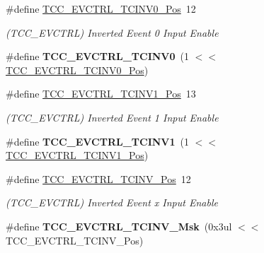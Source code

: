 \begin{DoxyCompactItemize}
\item 
\hypertarget{group___s_a_m_l21___t_c_c_ga7daf4150ce0d26a90f17b7d20997e5b0}{}\#define \hyperlink{group___s_a_m_l21___t_c_c_ga7daf4150ce0d26a90f17b7d20997e5b0}{T\+C\+C\+\_\+\+E\+V\+C\+T\+R\+L\+\_\+\+T\+C\+I\+N\+V0\+\_\+\+Pos}~12\label{group___s_a_m_l21___t_c_c_ga7daf4150ce0d26a90f17b7d20997e5b0}

\begin{DoxyCompactList}\small\item\em (T\+C\+C\+\_\+\+E\+V\+C\+T\+R\+L) Inverted Event 0 Input Enable \end{DoxyCompactList}\item 
\hypertarget{group___s_a_m_l21___t_c_c_ga72c03f6e26459fcca39c701dbfada328}{}\#define {\bfseries T\+C\+C\+\_\+\+E\+V\+C\+T\+R\+L\+\_\+\+T\+C\+I\+N\+V0}~(1 $<$$<$ \hyperlink{group___s_a_m_l21___t_c_c_ga7daf4150ce0d26a90f17b7d20997e5b0}{T\+C\+C\+\_\+\+E\+V\+C\+T\+R\+L\+\_\+\+T\+C\+I\+N\+V0\+\_\+\+Pos})\label{group___s_a_m_l21___t_c_c_ga72c03f6e26459fcca39c701dbfada328}

\item 
\hypertarget{group___s_a_m_l21___t_c_c_ga8eac0133c857f9d5e1b7f58578a62379}{}\#define \hyperlink{group___s_a_m_l21___t_c_c_ga8eac0133c857f9d5e1b7f58578a62379}{T\+C\+C\+\_\+\+E\+V\+C\+T\+R\+L\+\_\+\+T\+C\+I\+N\+V1\+\_\+\+Pos}~13\label{group___s_a_m_l21___t_c_c_ga8eac0133c857f9d5e1b7f58578a62379}

\begin{DoxyCompactList}\small\item\em (T\+C\+C\+\_\+\+E\+V\+C\+T\+R\+L) Inverted Event 1 Input Enable \end{DoxyCompactList}\item 
\hypertarget{group___s_a_m_l21___t_c_c_gace287edcae5cd696105c4405301d0cf9}{}\#define {\bfseries T\+C\+C\+\_\+\+E\+V\+C\+T\+R\+L\+\_\+\+T\+C\+I\+N\+V1}~(1 $<$$<$ \hyperlink{group___s_a_m_l21___t_c_c_ga8eac0133c857f9d5e1b7f58578a62379}{T\+C\+C\+\_\+\+E\+V\+C\+T\+R\+L\+\_\+\+T\+C\+I\+N\+V1\+\_\+\+Pos})\label{group___s_a_m_l21___t_c_c_gace287edcae5cd696105c4405301d0cf9}

\item 
\hypertarget{group___s_a_m_l21___t_c_c_ga517b9a375c6274ec2b3545cbfafd3346}{}\#define \hyperlink{group___s_a_m_l21___t_c_c_ga517b9a375c6274ec2b3545cbfafd3346}{T\+C\+C\+\_\+\+E\+V\+C\+T\+R\+L\+\_\+\+T\+C\+I\+N\+V\+\_\+\+Pos}~12\label{group___s_a_m_l21___t_c_c_ga517b9a375c6274ec2b3545cbfafd3346}

\begin{DoxyCompactList}\small\item\em (T\+C\+C\+\_\+\+E\+V\+C\+T\+R\+L) Inverted Event x Input Enable \end{DoxyCompactList}\item 
\hypertarget{group___s_a_m_l21___t_c_c_gaf726fe8f486fa1b23d3b4fb8e6786c5e}{}\#define {\bfseries T\+C\+C\+\_\+\+E\+V\+C\+T\+R\+L\+\_\+\+T\+C\+I\+N\+V\+\_\+\+Msk}~(0x3ul $<$$<$ T\+C\+C\+\_\+\+E\+V\+C\+T\+R\+L\+\_\+\+T\+C\+I\+N\+V\+\_\+\+Pos)\label{group___s_a_m_l21___t_c_c_gaf726fe8f486fa1b23d3b4fb8e6786c5e}


\end{DoxyCompactItemize}
